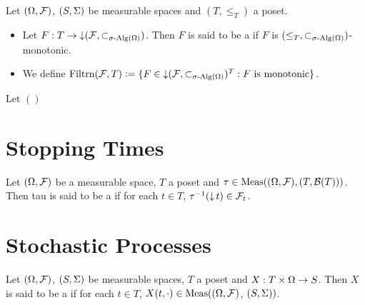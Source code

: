 \documentclass{book}
\begin{document}
	\begin{defn}
		Let $(\Omega, \mathcal{F})$, $(S, \Sigma)$ be measurable spaces and $(T, \leq_T)$ a poset. 
		\begin{itemize}
			\item Let $F:T \rightarrow  \operatorname{\downarrow}(\mathcal{F}, \subset_{\sigma\text{-Alg}(\Omega)})$. Then $F$ is said to be a  if $F$ is $(\leq_T, \subset_{\sigma\text{-Alg}(\Omega)})$-monotonic.
			\item We define $\text{Filtrn}(\mathcal{F}, T) \vcentcolon= \{F \in \operatorname{\downarrow}(\mathcal{F}, \subset_{\sigma\text{-Alg}(\Omega)})^T: \text{$F$ is monotonic} \}$. 
		\end{itemize}  
	\end{defn}
	
	\begin{defn}
		Let $()$
	\end{defn}
	
	
	
	
	
	
	
	
	
	
	
	
	
	
	
	
	
	
	
	
	
	\newpage
	\section{Stopping Times}
	
	\begin{defn}
		Let $(\Omega, \mathcal{F})$ be a measurable space, $T$ a poset and $\tau \in \operatorname{\text{Meas}}((\Omega, \mathcal{F}), (T, \mathcal{B}(T)))$. Then tau is said to be a  if for each $t \in T$, $\tau^{-1}(\operatorname{\downarrow} t) \in \mathcal{F}_t$. 
	\end{defn}
	
	\begin{ex}
		
	\end{ex}
	
	
	
	
	
	
	
	
	
	
	
	
	\newpage
	\section{Stochastic Processes}
	
	\begin{defn}
		Let $(\Omega, \mathcal{F})$, $(S, \Sigma)$ be measurable spaces, $T$ a poset and $X: T \times \Omega \rightarrow S$. Then $X$ is said to be a  if for each $t \in T$, $X(t, \cdot) \in \operatorname{\text{Meas}}((\Omega, \mathcal{F})$, $(S, \Sigma))$. 
	\end{defn}
	
\end{document}
